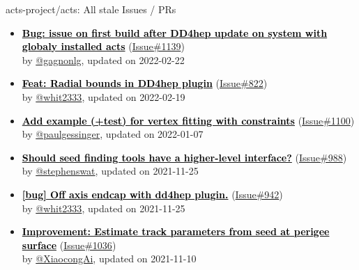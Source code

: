 \begin{frame}[allowframebreaks]{ acts-project/acts: All stale Issues / PRs}
\begin{itemize}
    \item
    \textbf{\href{https://github.com/acts-project/acts/issues/1139}{\textcolor{black}{Bug: issue on first build after DD4hep update on system with globaly installed acts}}}
    (\href{https://github.com/acts-project/acts/issues/1139}{Issue\#1139}) \\
    by \href{https://github.com/gagnonlg}{ @gagnonlg}, updated on 2022-02-22

    \item
    \textbf{\href{https://github.com/acts-project/acts/issues/822}{\textcolor{black}{Feat: Radial bounds in DD4hep plugin}}}
    (\href{https://github.com/acts-project/acts/issues/822}{Issue\#822}) \\
    by \href{https://github.com/whit2333}{ @whit2333}, updated on 2022-02-19

    \item
    \textbf{\href{https://github.com/acts-project/acts/issues/1100}{\textcolor{black}{Add example (+test) for vertex fitting with constraints}}}
    (\href{https://github.com/acts-project/acts/issues/1100}{Issue\#1100}) \\
    by \href{https://github.com/paulgessinger}{ @paulgessinger}, updated on 2022-01-07

    \item
    \textbf{\href{https://github.com/acts-project/acts/issues/988}{\textcolor{black}{Should seed finding tools have a higher-level interface?}}}
    (\href{https://github.com/acts-project/acts/issues/988}{Issue\#988}) \\
    by \href{https://github.com/stephenswat}{ @stephenswat}, updated on 2021-11-25

    \item
    \textbf{\href{https://github.com/acts-project/acts/issues/942}{\textcolor{black}{[bug] Off axis endcap with dd4hep plugin.}}}
    (\href{https://github.com/acts-project/acts/issues/942}{Issue\#942}) \\
    by \href{https://github.com/whit2333}{ @whit2333}, updated on 2021-11-25

    \item
    \textbf{\href{https://github.com/acts-project/acts/issues/1036}{\textcolor{black}{Improvement: Estimate track parameters from seed at perigee surface}}}
    (\href{https://github.com/acts-project/acts/issues/1036}{Issue\#1036}) \\
    by \href{https://github.com/XiaocongAi}{ @XiaocongAi}, updated on 2021-11-10


\end{itemize}
\end{frame}
